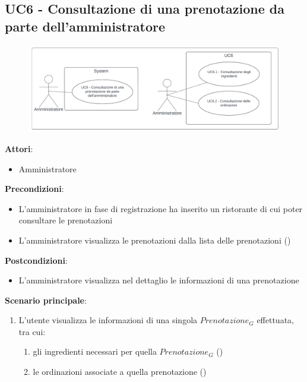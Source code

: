 \subsection{UC6 - Consultazione di una prenotazione da parte dell'amministratore}\label{usecase:6}
\begin{figure}[H]
  \centering
  \includegraphics[width=1\textwidth]{ucd/UCD6_new.png}
\end{figure}
\textbf{Attori}:
\begin{itemize}
    \item Amministratore
\end{itemize}
\textbf{Precondizioni}:
\begin{itemize}
    \item L'amministratore in fase di registrazione ha inserito un ristorante di cui poter consultare le prenotazioni
    \item L'amministratore visualizza le prenotazioni dalla lista delle prenotazioni ()
\end{itemize}
\textbf{Postcondizioni}:
\begin{itemize}
    \item L'amministratore visualizza nel dettaglio le informazioni di una prenotazione
\end{itemize}
\textbf{Scenario principale}:
\begin{enumerate}
    \item L'utente visualizza le informazioni di una singola $\textit{Prenotazione}_G$ effettuata, tra cui:
    \begin{enumerate}
        \item gli ingredienti necessari per quella $\textit{Prenotazione}_G$ ()
        \item le ordinazioni associate a quella prenotazione
        ()
    \end{enumerate}
\end{enumerate}